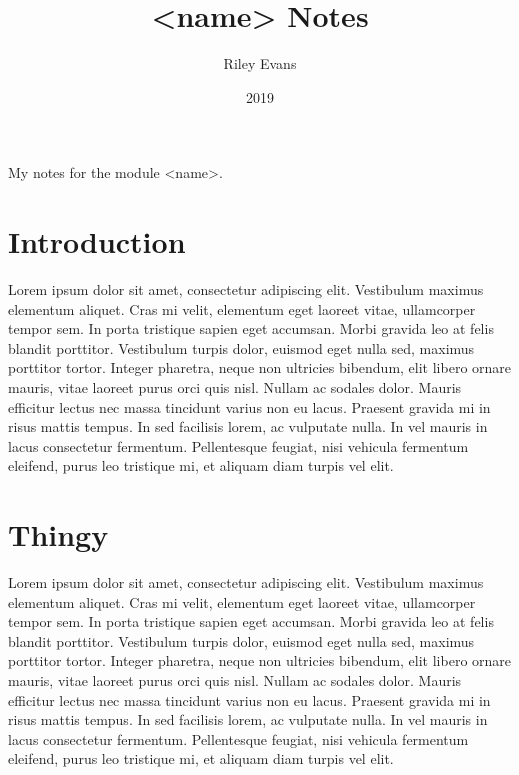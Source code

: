 \documentclass{article}
\title{<name> Notes}
\author{Riley Evans}
\date{2019}
\begin{document}
\secfont
\maketitle
\normalfont
\begin{center}
My notes for the module <name>. 
\end{center}




\section*{Introduction}
Lorem ipsum dolor sit amet, consectetur adipiscing elit. Vestibulum maximus elementum aliquet. Cras mi velit, elementum eget laoreet vitae, ullamcorper tempor sem. In porta tristique sapien eget accumsan. Morbi gravida leo at felis blandit porttitor. Vestibulum turpis dolor, euismod eget nulla sed, maximus porttitor tortor. Integer pharetra, neque non ultricies bibendum, elit libero ornare mauris, vitae laoreet purus orci quis nisl. Nullam ac sodales dolor. Mauris efficitur lectus nec massa tincidunt varius non eu lacus. Praesent gravida mi in risus mattis tempus. In sed facilisis lorem, ac vulputate nulla. In vel mauris in lacus consectetur fermentum. Pellentesque feugiat, nisi vehicula fermentum eleifend, purus leo tristique mi, et aliquam diam turpis vel elit.
\newpage


\tableofcontents
\newpage

\section{Thingy}
Lorem ipsum dolor sit amet, consectetur adipiscing elit. Vestibulum maximus elementum aliquet. Cras mi velit, elementum eget laoreet vitae, ullamcorper tempor sem. In porta tristique sapien eget accumsan. Morbi gravida leo at felis blandit porttitor. Vestibulum turpis dolor, euismod eget nulla sed, maximus porttitor tortor. Integer pharetra, neque non ultricies bibendum, elit libero ornare mauris, vitae laoreet purus orci quis nisl. Nullam ac sodales dolor. Mauris efficitur lectus nec massa tincidunt varius non eu lacus. Praesent gravida mi in risus mattis tempus. In sed facilisis lorem, ac vulputate nulla. In vel mauris in lacus consectetur fermentum. Pellentesque feugiat, nisi vehicula fermentum eleifend, purus leo tristique mi, et aliquam diam turpis vel elit.
\end{document}
